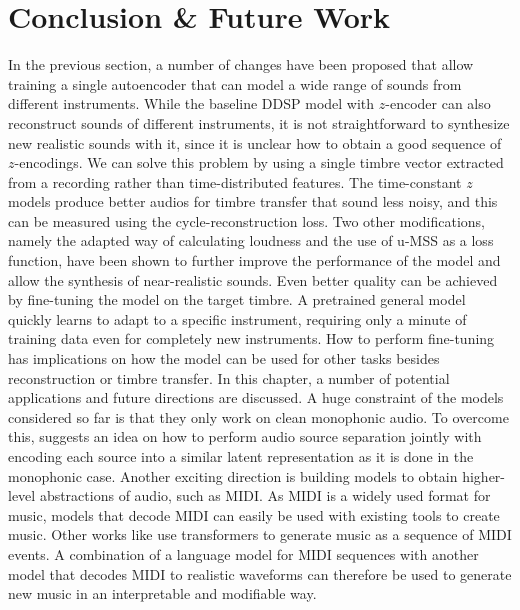 
\chapter{Conclusion \& Future Work}
\label{conclusion}
In the previous section, a number of changes have been proposed that allow training a single autoencoder that can model a wide range of sounds from different instruments.
While the baseline DDSP model with $z$-encoder can also reconstruct sounds of different instruments, it is not straightforward to synthesize new realistic sounds with it, since it is unclear how to obtain a good sequence of $z$-encodings.
We can solve this problem by using a single timbre vector extracted from a recording rather than time-distributed features. The time-constant $z$ models produce better audios for timbre transfer that sound less noisy, and this can be measured using the cycle-reconstruction loss. \newline
Two other modifications, namely the adapted way of calculating loudness and the use of u-MSS as a loss function, have been shown to further improve the performance of the model and allow the synthesis of near-realistic sounds. \newline
Even better quality can be achieved by fine-tuning the model on the target timbre. A pretrained general model quickly learns to adapt to a specific instrument, requiring only a minute of training data even for completely new instruments. How to perform fine-tuning has implications on how the model can be used for other tasks besides reconstruction or timbre transfer. \newline
In this chapter, a number of potential applications and future directions are discussed.
A huge constraint of the models considered so far is that they only work on clean monophonic audio. To overcome this,  suggests an idea on how to perform audio source separation jointly with encoding each source into a similar latent representation as it is done in the monophonic case. \newline
Another exciting direction is building models to obtain higher-level abstractions of audio, such as MIDI. As MIDI is a widely used format for music, models that decode MIDI can easily be used with existing tools to create music. Other works like \citet{music-transformer} use transformers to generate music as a sequence of MIDI events. A combination of a language model for MIDI sequences with another model that decodes MIDI to realistic waveforms can therefore be used to generate new music in an interpretable and modifiable way. \newline
